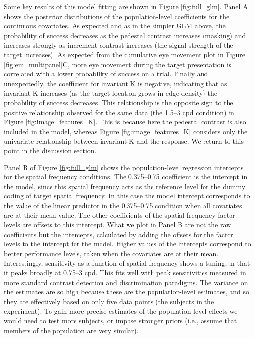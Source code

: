 \documentclass[11pt,a4paper]{article}
\begin{document}
{Some key results of this model fitting are shown in Figure \ref{fig:full_glm}.
Panel A shows the posterior distributions of the population-level coefficients for the continuous covariates.
As expected and as in the simpler GLM above, the probability of success decreases as the pedestal contrast increases (masking) and increases strongly as increment contrast increases (the signal strength of the target increases).
As expected from the cumulative eye movement plot in Figure \ref{fig:em_multipanel}C, more eye movement during the target presentation is correlated with a lower probability of success on a trial.
Finally and unexpectedly, the coefficient for invariant K is negative, indicating that as invariant K increases (as the target location grows in edge density) the probability of success decreases.
This relationship is the opposite sign to the positive relationship observed for the same data (the 1.5--3 cpd condition) in Figure \ref{fig:image_features_K}.
This is because here the pedestal contrast is also included in the model, whereas Figure \ref{fig:image_features_K} considers only the univariate relationship between invariant K and the response.
We return to this point in the discussion section.

Panel B of Figure \ref{fig:full_glm} shows the population-level regression intercepts for the spatial frequency conditions.
The 0.375--0.75 coefficient is the intercept in the model, since this spatial frequency acts as the reference level for the dummy coding of target spatial frequency.
In this case the model intercept corresponds to the value of the linear predictor in the 0.375--0.75 condition when all covariates are at their mean value.
The other coefficients of the spatial frequency factor levels are offsets to this intercept.
What we plot in Panel B are not the raw coefficients but the intercepts, calculated by adding the offsets for the factor levels to the intercept for the model.
Higher values of the intercepts correspond to better performance levels, taken when the covariates are at their mean.
Interestingly, sensitivity as a function of spatial frequency shows a tuning, in that it peaks broadly at 0.75--3 cpd.
This fits well with peak sensitivities measured in more standard contrast detection and discrimination paradigms.
The variance on the estimates are so high because these are the population-level estimates, and so they are effectively based on only five data points (the subjects in the experiment).
To gain more precise estimates of the population-level effects we would need to test more subjects, or impose stronger priors (i.e., assume that members of the population are very similar).

}
\end{document}
